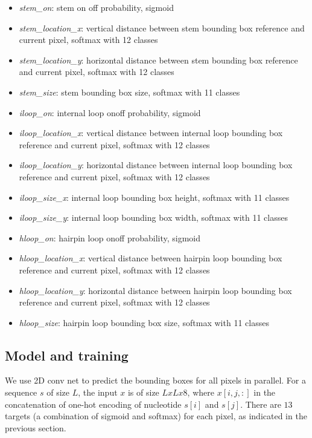 \documentclass[12pt]{article}
\begin{document}
\begin{itemize}
    \item \textit{stem\_on}: stem on off probability, sigmoid
    \item \textit{stem\_location\_x}: vertical distance between stem bounding box reference and current pixel, softmax with 12 classes
    \item \textit{stem\_location\_y}: horizontal distance between stem bounding box reference and current pixel, softmax with 12 classes
    \item \textit{stem\_size}: stem bounding box size, softmax with 11 classes

    \item \textit{iloop\_on}: internal loop on\/off probability, sigmoid
    \item \textit{iloop\_location\_x}: vertical distance between internal loop bounding box reference and current pixel, softmax with 12 classes
    \item \textit{iloop\_location\_y}: horizontal distance between internal loop bounding box reference and current pixel, softmax with 12 classes
    \item \textit{iloop\_size\_x}: internal loop bounding box height, softmax with 11 classes
    \item \textit{iloop\_size\_y}: internal loop bounding box width, softmax with 11 classes

    \item \textit{hloop\_on}: hairpin loop on\/off probability, sigmoid
    \item \textit{hloop\_location\_x}: vertical distance between hairpin loop bounding box reference and current pixel, softmax with 12 classes
    \item \textit{hloop\_location\_y}: horizontal distance between hairpin loop bounding box reference and current pixel, softmax with 12 classes
    \item \textit{hloop\_size}: hairpin loop bounding box size, softmax with 11 classes
\end{itemize}



\subsection{Model and training}

We use 2D conv net to predict the bounding boxes for all pixels in parallel.
For a sequence $s$ of size $L$, the input $x$ is of size $L x L x 8$, where $x[i, j, :]$
in the concatenation of one-hot encoding of nucleotide $s[i]$ and $s[j]$.
There are $13$ targets (a combination of sigmoid and softmax) for each pixel,
as indicated in the previous section.
\end{document}

